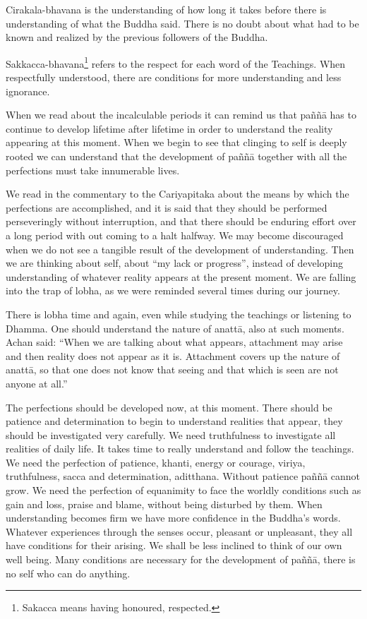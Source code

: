 Cirakala-bhavana is the understanding of how long it takes before there is understanding of what the Buddha said. There is no doubt about what had to be known and 
realized by the previous followers of the Buddha. 

Sakkacca-bhavana\footnote{Sakacca means having honoured, respected. } refers to the respect for each word of the Teachings. When respectfully understood, there are conditions for more understanding and less ignorance. 

When we read about the incalculable periods it can remind us that paññā has to continue to develop lifetime after lifetime in order to understand the reality appearing at this moment. When we begin to see that clinging to self is deeply rooted we can understand that the development of paññā together with all the perfections must take innumerable lives. 

We read in the commentary to the Cariyapitaka about the means by which the perfections are accomplished, and it is said that they should be performed perseveringly 
without interruption, and that there should be enduring effort over a long period with 
out coming to a halt halfway. We may become discouraged when we do not see a 
tangible result of the development of understanding. Then we are thinking about self, 
about ``my lack or progress'', instead of developing understanding of whatever reality 
appears at the present moment. We are falling into the trap of lobha, as we were reminded several times during our journey. 

There is lobha time and again, even while studying the teachings or listening to 
Dhamma. One should understand the nature of anattā, also at such moments. Achan 
said: ``When we are talking about what appears, attachment may arise and then reality 
does not appear as it is. Attachment covers up the nature of anattā, so that one does 
not know that seeing and that which is seen are not anyone at all.'' 

The perfections should be developed now, at this moment. There should be patience 
and determination to begin to understand realities that appear, they should be investigated very carefully. We need truthfulness to investigate all realities of daily life. It 
takes time to really understand and follow the teachings. We need the perfection of 
patience, khanti, energy or courage, viriya, truthfulness, sacca and determination, 
aditthana. Without patience paññā cannot grow. We need the perfection of equanimity to face the worldly conditions such as gain and loss, praise and blame, without being disturbed by them. When understanding becomes firm we have more confidence 
in the Buddha’s words. Whatever experiences through the senses occur, pleasant or 
unpleasant, they all have conditions for their arising. We shall be less inclined to 
think of our own well being. Many conditions are necessary for the development of 
paññā, there is no self who can do anything. 

